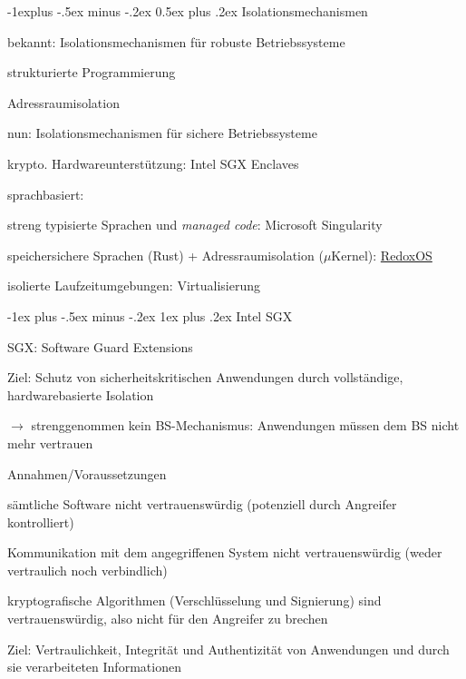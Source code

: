 \documentclass[a4paper]{article}
\makeatletter
\renewcommand{\subsection}{\@startsection{subsection}{2}{0mm}%
 {-1explus -.5ex minus -.2ex}%
 {0.5ex plus .2ex}%
 {\normalfont\normalsize\bfseries}}
\renewcommand{\subsubsection}{\@startsection{subsubsection}{3}{0mm}%
 {-1ex plus -.5ex minus -.2ex}%
 {1ex plus .2ex}%
 {\normalfont\small\bfseries}}
\makeatother
\begin{document}
\begin{multicols}{3}
    \subsection{Isolationsmechanismen}
    \begin{itemize*}
        \item bekannt: Isolationsmechanismen für robuste Betriebssysteme
        \begin{itemize*}
            \item strukturierte Programmierung
            \item Adressraumisolation
        \end{itemize*}
        \item nun: Isolationsmechanismen für sichere Betriebssysteme
        \begin{itemize*}
            \item krypto. Hardwareunterstützung: Intel SGX Enclaves
            \item sprachbasiert:
            \begin{itemize*}
                \item streng typisierte Sprachen und \emph{managed code}: Microsoft Singularity
                \item speichersichere Sprachen (Rust) + Adressraumisolation ($\mu$Kernel): \href{https://www.redox-os.org/}{RedoxOS}
            \end{itemize*}
            \item isolierte Laufzeitumgebungen: Virtualisierung
        \end{itemize*}
    \end{itemize*}

    \subsubsection{Intel SGX}
    \begin{itemize*}
        \item SGX: Software Guard Extensions
        \item Ziel: Schutz von sicherheitskritischen Anwendungen durch vollständige, hardwarebasierte Isolation
        \item $\rightarrow$ strenggenommen kein BS-Mechanismus: Anwendungen müssen dem BS nicht mehr vertrauen
        \item Annahmen/Voraussetzungen
    \end{itemize*}
    \begin{enumerate*}
        \item sämtliche Software nicht vertrauenswürdig (potenziell durch Angreifer kontrolliert)
        \item Kommunikation mit dem angegriffenen System nicht vertrauenswürdig (weder vertraulich noch verbindlich)
        \item kryptografische Algorithmen (Verschlüsselung und Signierung) sind vertrauenswürdig, also nicht für den Angreifer zu brechen
        \item Ziel: Vertraulichkeit, Integrität und Authentizität von Anwendungen und durch sie verarbeiteten Informationen
    \end{enumerate*}


\end{multicols}
\end{document}
